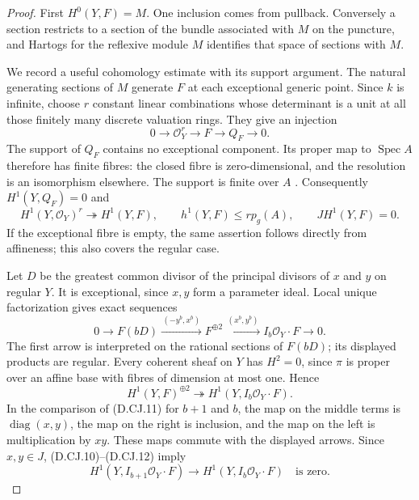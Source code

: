\begin{proof}
First $H^0(Y,F)=M$. One inclusion comes from pullback. Conversely
a section restricts to a section of the bundle associated with
$M$ on the puncture, and Hartogs for the reflexive module $M$
identifies that space of sections with $M$.

We record a useful cohomology estimate with its support argument.
The natural generating sections of $M$ generate $F$ at each
exceptional generic point. Since $k$ is infinite, choose $r$
constant linear combinations whose determinant is a unit at all
those finitely many discrete valuation rings. They give an
injection
\[
                   0\longrightarrow\mathcal O_Y^r
                       \longrightarrow F\longrightarrow Q_F
                       \longrightarrow0.
                                                        \tag{D.CJ.9}
\]
The support of $Q_F$ contains no exceptional component. Its
proper map to $\operatorname{Spec}A$ therefore has finite fibres:
the closed fibre is zero-dimensional, and the resolution is an
isomorphism elsewhere. The support is finite over $A$
\citep[Lemma~37.44.1 and complete proof, Tag 02LS]
{StacksCanonicalJetsB}. Consequently $H^1(Y,Q_F)=0$ and
\[
 H^1(Y,\mathcal O_Y)^r\twoheadrightarrow H^1(Y,F),
 \qquad h^1(Y,F)\le r p_g(A),\qquad JH^1(Y,F)=0.
                                                        \tag{D.CJ.10}
\]
If the exceptional fibre is empty, the same assertion follows
directly from affineness; this also covers the regular case.

Let $D$ be the greatest common divisor of the principal divisors
of $x$ and $y$ on regular $Y$. It is exceptional, since $x,y$
form a parameter ideal. Local unique factorization gives exact
sequences
\[
 0\longrightarrow F(bD)\xrightarrow{\,(-y^b,x^b)\,}
     F^{\oplus2}\xrightarrow{\,(x^b,y^b)\,}
     I_b\mathcal O_Y\cdot F\longrightarrow0.
                                                        \tag{D.CJ.11}
\]
The first arrow is interpreted on the rational sections of
$F(bD)$; its displayed products are regular. Every coherent
sheaf on $Y$ has $H^2=0$, since $\pi$ is proper over an affine
base with fibres of dimension at most one. Hence
\[
          H^1(Y,F)^{\oplus2}\twoheadrightarrow
                      H^1(Y,I_b\mathcal O_Y\cdot F).
                                                        \tag{D.CJ.12}
\]
In the comparison of (D.CJ.11) for $b+1$ and $b$, the map on
the middle terms is $\operatorname{diag}(x,y)$, the map on
the right is inclusion, and the map on the left is
multiplication by $xy$. These maps commute with the displayed
arrows. Since $x,y\in J$, (D.CJ.10)--(D.CJ.12) imply
\[
 H^1(Y,I_{b+1}\mathcal O_Y\cdot F)
                  \longrightarrow H^1(Y,I_b\mathcal O_Y\cdot F)
                        \quad\text{is zero}.
                                                        \tag{D.CJ.13}
\]


\end{proof}
